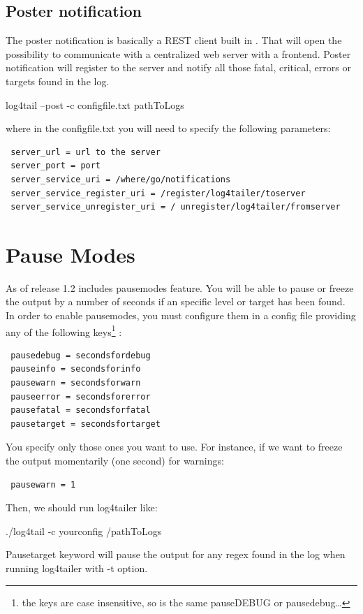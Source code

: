 \subsection{Poster notification}
\label{sec:poster}
The poster notification is basically a REST client built in \logftailer{}. That will open 
the possibility to communicate with a centralized web server with a frontend. Poster 
notification will register to the server and notify all those fatal, critical, errors or 
targets found in the log. 
\begin{cmd}
 log4tail --post -c configfile.txt pathToLogs
\end{cmd}
where in the configfile.txt you will need to specify the following parameters:
\begin{verbatim}
 server_url = url to the server
 server_port = port
 server_service_uri = /where/go/notifications
 server_service_register_uri = /register/log4tailer/toserver
 server_service_unregister_uri = / unregister/log4tailer/fromserver
\end{verbatim}


\section{Pause Modes}

\label{sec:PauseModes}As of release 1.2 \logftailer{} includes pausemodes feature. You will be able 
to pause or freeze the output by a number of seconds if an specific level or target 
has been found. In order to enable pausemodes, you must configure them in a config file 
providing any of the following keys\footnote{the keys are case insensitive, so is the same pauseDEBUG or pausedebug\ldots} :
\begin{verbatim}
 pausedebug = secondsfordebug
 pauseinfo = secondsforinfo
 pausewarn = secondsforwarn
 pauseerror = secondsforerror
 pausefatal = secondsforfatal
 pausetarget = secondsfortarget
\end{verbatim}
You specify only those ones you want to use.
For instance, if we want to freeze the output momentarily (one second) for warnings:
\begin{verbatim}
 pausewarn = 1
\end{verbatim}
Then, we should run log4tailer like:
\begin{cmd}
./log4tail -c yourconfig /pathToLogs
\end{cmd}
Pausetarget keyword will pause the output for any regex found in the log when running log4tailer with -t option.


